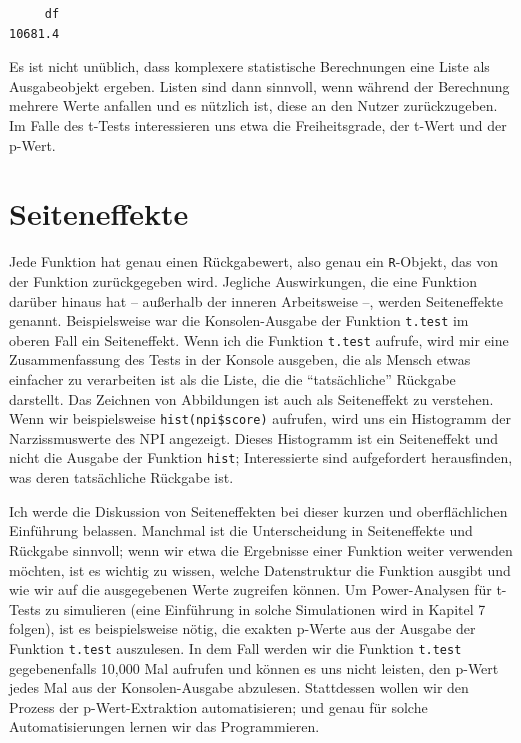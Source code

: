 \documentclass[12pt,]{tufte-book}
\newenvironment{Shaded}{\begin{snugshade}}{\end{snugshade}}
\newcommand{\CommentTok}[1]{\textcolor[rgb]{0.56,0.35,0.01}{\textit{#1}}}
\newcommand{\OperatorTok}[1]{\textcolor[rgb]{0.81,0.36,0.00}{\textbf{#1}}}
\newcommand{\NormalTok}[1]{#1}
\theoremstyle{definition}
\theoremstyle{definition}
\theoremstyle{definition}
\theoremstyle{remark}
\begin{document}
\begin{Shaded}
\end{Shaded}

\begin{verbatim}
     df 
10681.4 
\end{verbatim}

Es ist nicht unüblich, dass komplexere statistische Berechnungen eine
Liste als Ausgabeobjekt ergeben. Listen sind dann sinnvoll, wenn während
der Berechnung mehrere Werte anfallen und es nützlich ist, diese an den
Nutzer zurückzugeben. Im Falle des t-Tests interessieren uns etwa die
Freiheitsgrade, der t-Wert und der p-Wert.

\section{Seiteneffekte}\label{seiteneffekte}

Jede Funktion hat genau einen Rückgabewert, also genau ein
\texttt{R}-Objekt, das von der Funktion zurückgegeben wird. Jegliche
Auswirkungen, die eine Funktion darüber hinaus hat -- außerhalb der
inneren Arbeitsweise --, werden Seiteneffekte genannt. Beispielsweise
war die Konsolen-Ausgabe der Funktion \texttt{t.test} im oberen Fall ein
Seiteneffekt. Wenn ich die Funktion \texttt{t.test} aufrufe, wird mir
eine Zusammenfassung des Tests in der Konsole ausgeben, die als Mensch
etwas einfacher zu verarbeiten ist als die Liste, die die
``tatsächliche'' Rückgabe darstellt. Das Zeichnen von Abbildungen ist
auch als Seiteneffekt zu verstehen. Wenn wir beispielsweise
\texttt{hist(npi\$score)} aufrufen, wird uns ein Histogramm der
Narzissmuswerte des NPI angezeigt. Dieses Histogramm ist ein
Seiteneffekt und nicht die Ausgabe der Funktion \texttt{hist};
Interessierte sind aufgefordert herausfinden, was deren tatsächliche
Rückgabe ist.

Ich werde die Diskussion von Seiteneffekten bei dieser kurzen und
oberflächlichen Einführung belassen. Manchmal ist die Unterscheidung in
Seiteneffekte und Rückgabe sinnvoll; wenn wir etwa die Ergebnisse einer
Funktion weiter verwenden möchten, ist es wichtig zu wissen, welche
Datenstruktur die Funktion ausgibt und wie wir auf die ausgegebenen
Werte zugreifen können. Um Power-Analysen für t-Tests zu simulieren
(eine Einführung in solche Simulationen wird in Kapitel 7 folgen), ist
es beispielsweise nötig, die exakten p-Werte aus der Ausgabe der
Funktion \texttt{t.test} auszulesen. In dem Fall werden wir die Funktion
\texttt{t.test} gegebenenfalls 10,000 Mal aufrufen und können es uns
nicht leisten, den p-Wert jedes Mal aus der Konsolen-Ausgabe abzulesen.
Stattdessen wollen wir den Prozess der p-Wert-Extraktion automatisieren;
und genau für solche Automatisierungen lernen wir das Programmieren.
\end{document}
